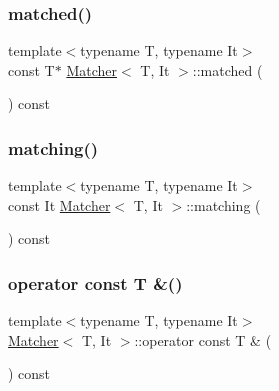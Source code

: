\mbox{\label{class_matcher_a6a43511495d338b4572dcb52e96fc3a3}} 
\subsubsection{\texorpdfstring{matched()}{matched()}}
{\footnotesize\ttfamily template$<$typename T, typename It$>$ \\
const T$\ast$ \hyperlink{class_matcher}{Matcher}$<$ T, It $>$\+::matched (\begin{DoxyParamCaption}{ }\end{DoxyParamCaption}) const\hspace{0.3cm}{\ttfamily [inline]}}

\mbox{\label{class_matcher_abf9d0a1f24372dc9dde031ae6df26921}} 
\subsubsection{\texorpdfstring{matching()}{matching()}}
{\footnotesize\ttfamily template$<$typename T, typename It$>$ \\
const It \hyperlink{class_matcher}{Matcher}$<$ T, It $>$\+::matching (\begin{DoxyParamCaption}{ }\end{DoxyParamCaption}) const\hspace{0.3cm}{\ttfamily [inline]}}

\mbox{\label{class_matcher_a7b808eac9d5d10c2d417869bf630d6ec}} 
\subsubsection{\texorpdfstring{operator const T \&()}{operator const T \&()}}
{\footnotesize\ttfamily template$<$typename T, typename It$>$ \\
\hyperlink{class_matcher}{Matcher}$<$ T, It $>$\+::operator const T \& (\begin{DoxyParamCaption}{ }\end{DoxyParamCaption}) const\hspace{0.3cm}{\ttfamily [inline]}}

